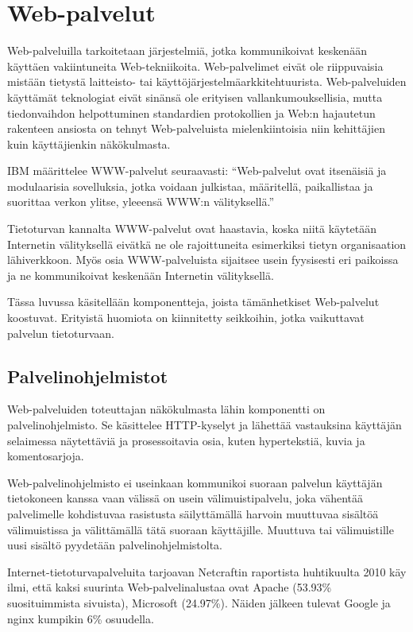 
\chapter{Web-palvelut}

Web-palveluilla tarkoitetaan järjestelmiä, jotka kommunikoivat
keskenään käyttäen vakiintuneita Web-tekniikoita. Web-palvelimet eivät
ole riippuvaisia mistään tietystä laitteisto- tai
käyttöjärjestelmäarkkitehtuurista. Web-palveluiden käyttämät
teknologiat eivät sinänsä ole erityisen vallankumouksellisia, mutta
tiedonvaihdon helpottuminen standardien protokollien ja Web:n
hajautetun rakenteen ansiosta on tehnyt Web-palveluista
mielenkiintoisia niin kehittäjien kuin käyttäjienkin
näkökulmasta\cite{javaweb}.

IBM määrittelee WWW-palvelut seuraavasti: ``Web-palvelut ovat
itsenäisiä ja modulaarisia sovelluksia, jotka voidaan julkistaa,
määritellä, paikallistaa ja suorittaa verkon ylitse, yleeensä WWW:n
välityksellä.''\cite[s.4]{websecurity}

Tietoturvan kannalta WWW-palvelut ovat haastavia, koska niitä
käytetään Internetin välityksellä eivätkä ne ole rajoittuneita
esimerkiksi tietyn organisaation lähiverkkoon. Myös osia
WWW-palveluista sijaitsee usein fyysisesti eri paikoissa ja ne
kommunikoivat keskenään Internetin välityksellä.

Tässa luvussa käsitellään komponentteja, joista tämänhetkiset
Web-palvelut koostuvat. Erityistä huomiota on kiinnitetty seikkoihin,
jotka vaikuttavat palvelun tietoturvaan.

\section{Palvelinohjelmistot}

Web-palveluiden toteuttajan näkökulmasta lähin komponentti on
palvelinohjelmisto. Se käsittelee HTTP-kyselyt ja lähettää vastauksina
käyttäjän selaimessa näytettäviä ja prosessoitavia osia, kuten
hypertekstiä, kuvia ja komentosarjoja.

Web-palvelinohjelmisto ei useinkaan kommunikoi suoraan palvelun
käyttäjän tietokoneen kanssa vaan välissä on usein välimuistipalvelu,
joka vähentää palvelimelle kohdistuvaa rasistusta säilyttämällä
harvoin muuttuvaa sisältöä välimuistissa ja välittämällä tätä suoraan
käyttäjille. Muuttuva tai välimuistille uusi sisältö pyydetään
palvelinohjelmistolta.

Internet-tietoturvapalveluita tarjoavan Netcraftin\cite{netcraft}
raportista huhtikuulta 2010 käy ilmi, että kaksi suurinta
Web-palvelinalustaa ovat Apache (53.93\% suosituimmista sivuista),
Microsoft (24.97\%). Näiden jälkeen tulevat Google ja nginx kumpikin 6\%
osuudella.

